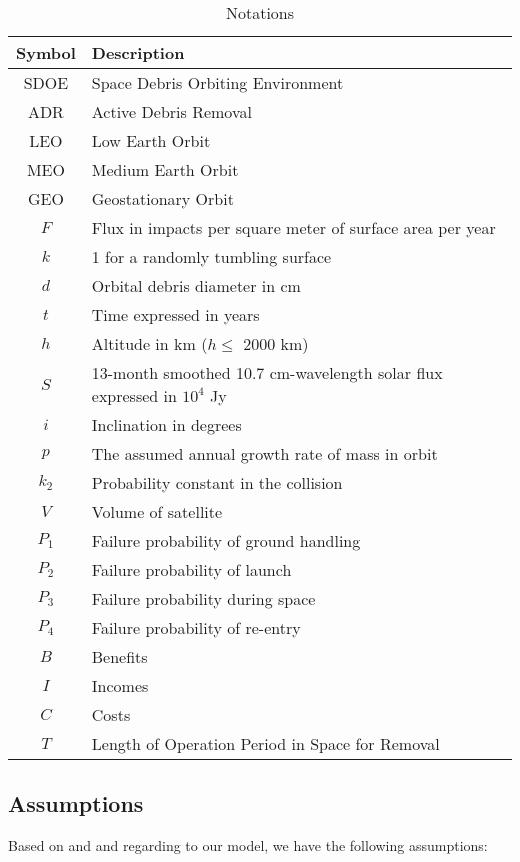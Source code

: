 \documentclass{mcmthesis}
\begin{document}
	\begin{table}[htbp]
		\centering
		\caption{Notations}
		\begin{tabular}{cl}
			\hline
			Symbol & Description \\
			\hline
			\hline
			SDOE & Space Debris Orbiting Environment \\
			ADR & Active Debris Removal \\
			LEO & Low Earth Orbit \\
			MEO & Medium Earth Orbit \\
			GEO & Geostationary Orbit \\
			$F$ & Flux in impacts per square meter of surface area per year \\
			$k$ & 1 for a randomly tumbling surface \\
			$d$ & Orbital debris diameter in cm \\
			$t$ & Time expressed in years \\
			$h$ & Altitude in km ($h\leq$ 2000 km)\\
			$S$ & 13-month smoothed 10.7 cm-wavelength solar flux expressed in $10^4$ Jy \\
			$i$ & Inclination in degrees\\
			$p$ & The assumed annual growth rate of mass in orbit\\
			$k_2$ & Probability constant in the collision\\
			$V$ & Volume of satellite\\
			$P_1$ & Failure probability of ground handling\\
			$P_2$ & Failure probability of launch\\
			$P_3$ & Failure probability during space\\
			$P_4$ & Failure probability of re-entry\\
			$B$ & Benefits\\
			$I$ & Incomes\\
			$C$ & Costs\\
			$T$ & Length of Operation Period in Space for Removal\\
			\hline
		\end{tabular}
		\label{Tab-Notations}
	\end{table}
	
\subsection{Assumptions}\label{Sec-Assumption}
	
	Based on \cite{flux} and \cite{White} and regarding to our model, we have the following assumptions:
	
\end{document}
